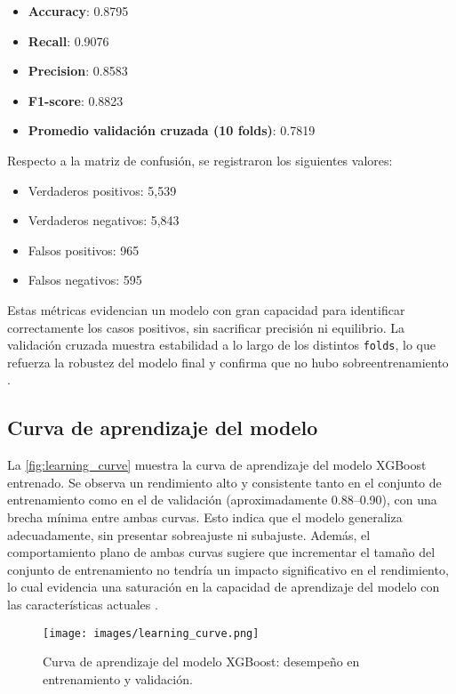\documentclass[12pt]{article}
\begin{document}
\begin{itemize}
    \item \textbf{Accuracy}: 0.8795
    \item \textbf{Recall}: 0.9076
    \item \textbf{Precision}: 0.8583
    \item \textbf{F1-score}: 0.8823
    \item \textbf{Promedio validación cruzada (10 folds)}: 0.7819
\end{itemize}

\noindent Respecto a la matriz de confusión, se registraron los siguientes valores:

\begin{itemize}
    \item Verdaderos positivos: 5,539
    \item Verdaderos negativos: 5,843
    \item Falsos positivos: 965
    \item Falsos negativos: 595
\end{itemize}

Estas métricas evidencian un modelo con gran capacidad para identificar correctamente los casos positivos, sin sacrificar precisión ni equilibrio. La validación cruzada muestra estabilidad a lo largo de los distintos \texttt{folds}, lo que refuerza la robustez del modelo final y confirma que no hubo sobreentrenamiento \parencite{geron2019hands}.

\subsection{Curva de aprendizaje del modelo}

La \autoref{fig:learning_curve} muestra la curva de aprendizaje del modelo XGBoost entrenado. Se observa un rendimiento alto y consistente tanto en el conjunto de entrenamiento como en el de validación (aproximadamente 0.88–0.90), con una brecha mínima entre ambas curvas. Esto indica que el modelo generaliza adecuadamente, sin presentar sobreajuste ni subajuste. Además, el comportamiento plano de ambas curvas sugiere que incrementar el tamaño del conjunto de entrenamiento no tendría un impacto significativo en el rendimiento, lo cual evidencia una saturación en la capacidad de aprendizaje del modelo con las características actuales \parencite{raschka2018,chen2015}.

\begin{figure}[H]
    \centering
    \texttt{[image: images/learning\_curve.png]}
    \caption{Curva de aprendizaje del modelo XGBoost: desempeño en entrenamiento y validación.}
    \label{fig:learning_curve}
\end{figure}
\end{document}
